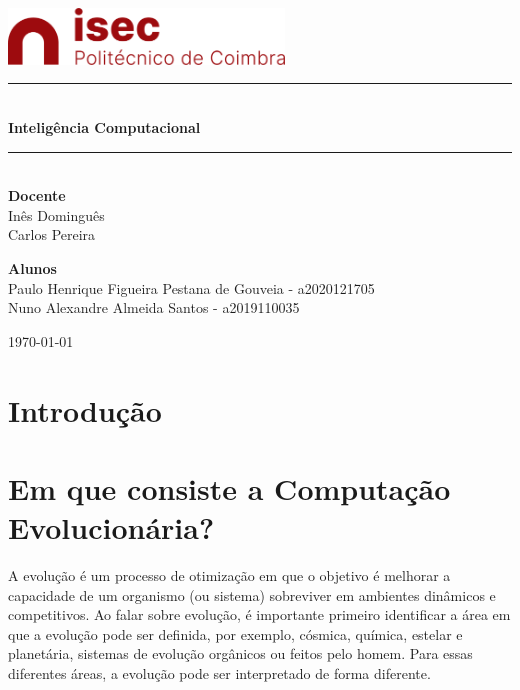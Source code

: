 \documentclass[10pt]{article}
\newcommand{\HRule}{\rule{\linewidth}{0.5mm}}
\begin{document}
\begin{titlepage}
\begin{center}

\includegraphics[width=0.55\textwidth]{img/logo-isec-transparente.png}~\\[2cm]


\HRule \\[0.4cm]
{ \LARGE 
  \textbf{Inteligência Computacional}\\[0.4cm]
}
\HRule \\[1.5cm]

{ \large
  \textbf{Docente} \\[0.1cm]
  Inês Dominguês \\ Carlos Pereira \\[2.5cm]
}


{ \large
  \textbf{Alunos} \\[0.1cm]
  Paulo Henrique Figueira Pestana de Gouveia - a2020121705 \\[0.1cm]
  Nuno Alexandre Almeida Santos - a2019110035\\[0.1cm]
}

\vfill



{\large \today}
 
\end{center}
\end{titlepage}


\newpage



\tableofcontents
{}
\newpage
\setcounter{page}{1}

\large
\section{Introdução}\label{sec:intro}

\section{Em que consiste a Computação Evolucionária?}\label{sec:comp-evo}
    A evolução é um processo de otimização em que o objetivo é melhorar a capacidade de um organismo (ou sistema) sobreviver em ambientes dinâmicos e competitivos.
    Ao falar sobre evolução, é importante primeiro identificar a área em que a evolução pode ser definida, por exemplo, cósmica, química, estelar e planetária,
sistemas de evolução orgânicos ou feitos pelo homem. Para essas diferentes áreas, a evolução pode
ser interpretado de forma diferente. 
    
\end{document}
